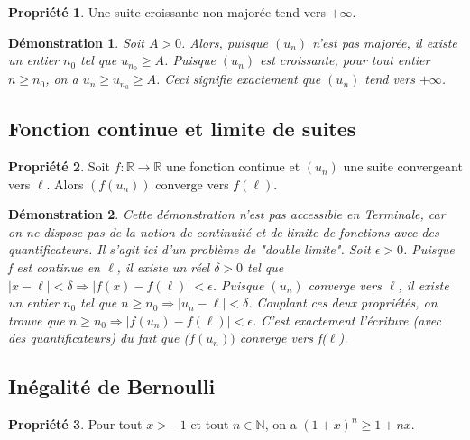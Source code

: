 \documentclass[a4paper,12pt,final]{article}
\newtheorem{Proof}{Démonstration}[section]
\theoremstyle{theorem}
\theoremstyle{definition}
\newtheorem{Propriete}{Propriété}[section]
\theoremstyle{definition}
\theoremstyle{definition}
\begin{document}
\begin{Propriete}
	Une suite croissante non majorée tend vers $+\infty$.
\end{Propriete}

\begin{Proof}
	Soit $A>0$. Alors, puisque $(u_{n})$ n'est pas majorée, il existe un entier $n_{0}$ tel que $u_{n_{0}} \geq A$. Puisque $(u_{n})$ est croissante, pour tout entier $n \geq n_{0}$, on a $u_{n} \geq u_{n_{0}} \geq A$. Ceci signifie exactement que $(u_{n})$ tend vers $+\infty$.
\end{Proof}

	\subsection{Fonction continue et limite de suites}
	
\begin{Propriete}
Soit $f:\mathbb{R} \rightarrow \mathbb{R}$ une fonction continue et $(u_{n})$ une suite convergeant vers $\ell$. Alors $(f(u_{n}))$ converge vers $f(\ell)$.
\end{Propriete}

\begin{Proof}
	Cette démonstration n'est pas accessible en Terminale, car on ne dispose pas de la notion de continuité et de limite de fonctions avec des quantificateurs. Il s'agit ici d'un problème de "double limite". Soit $\epsilon>0$. Puisque f est continue en $\ell$, il existe un réel $\delta>0$ tel que $|x−\ell|< \delta \Rightarrow |f(x)−f(\ell)|< \epsilon$. Puisque $(u_{n})$ converge vers $\ell$, il existe un entier $n_{0}$ tel que $n\geq n_{0} \Rightarrow |u_{n}−\ell|< \delta$. Couplant ces deux propriétés, on trouve que $n\geq n_{0} \Rightarrow |f(u_{n})−f(\ell)|< \epsilon$. C'est exactement l'écriture (avec des quantificateurs) du fait que ($f(u_{n}))$ converge vers f($\ell$).
\end{Proof}

	\subsection{Inégalité de Bernoulli}
	
\begin{Propriete}
	Pour tout $x>−1$ et tout $n \in \mathbb{N}$, on a $(1+x)^{n} \geq 1+nx$.
\end{Propriete} 
\end{document}

